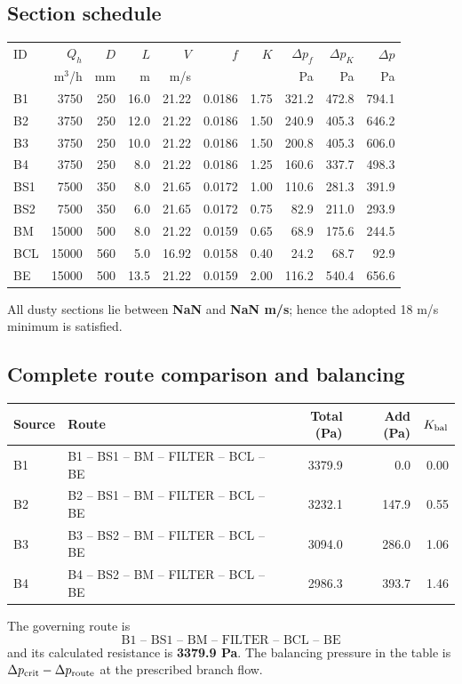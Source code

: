 \documentclass[11pt,a4paper]{article}
\begin{document}
\subsection{Section schedule}
\begin{center}\scriptsize
\begin{tabular}{lrrrrrrrrr}
\toprule
ID & $Q_h$ & $D$ & $L$ & $V$ & $f$ & $K$ & $\Delta p_f$ & $\Delta p_K$ & $\Delta p$\\
 & m$^3$/h & mm & m & m/s & & & Pa & Pa & Pa\\
\midrule
B1 & 3750 & 250 & 16.0 & 21.22 & 0.0186 & 1.75 & 321.2 & 472.8 & 794.1 \\
B2 & 3750 & 250 & 12.0 & 21.22 & 0.0186 & 1.50 & 240.9 & 405.3 & 646.2 \\
B3 & 3750 & 250 & 10.0 & 21.22 & 0.0186 & 1.50 & 200.8 & 405.3 & 606.0 \\
B4 & 3750 & 250 & 8.0 & 21.22 & 0.0186 & 1.25 & 160.6 & 337.7 & 498.3 \\
BS1 & 7500 & 350 & 8.0 & 21.65 & 0.0172 & 1.00 & 110.6 & 281.3 & 391.9 \\
BS2 & 7500 & 350 & 6.0 & 21.65 & 0.0172 & 0.75 & 82.9 & 211.0 & 293.9 \\
BM & 15000 & 500 & 8.0 & 21.22 & 0.0159 & 0.65 & 68.9 & 175.6 & 244.5 \\
BCL & 15000 & 560 & 5.0 & 16.92 & 0.0158 & 0.40 & 24.2 & 68.7 & 92.9 \\
BE & 15000 & 500 & 13.5 & 21.22 & 0.0159 & 2.00 & 116.2 & 540.4 & 656.6 \\
\bottomrule
\end{tabular}
\end{center}
All dusty sections lie between \textbf{NaN} and \textbf{NaN m/s}; hence the adopted 18 m/s minimum is satisfied.

\clearpage
\subsection{Complete route comparison and balancing}
\begin{center}\small
\begin{tabular}{llrrr}
\toprule
Source & Route & Total (Pa) & Add (Pa) & $K_{\rm bal}$\\
\midrule
B1 & B1 -- BS1 -- BM -- FILTER -- BCL -- BE & 3379.9 & 0.0 & 0.00 \\
B2 & B2 -- BS1 -- BM -- FILTER -- BCL -- BE & 3232.1 & 147.9 & 0.55 \\
B3 & B3 -- BS2 -- BM -- FILTER -- BCL -- BE & 3094.0 & 286.0 & 1.06 \\
B4 & B4 -- BS2 -- BM -- FILTER -- BCL -- BE & 2986.3 & 393.7 & 1.46 \\
\bottomrule
\end{tabular}
\end{center}
The governing route is
\[
\boxed{\text{B1 -- BS1 -- BM -- FILTER -- BCL -- BE}}
\]
and its calculated resistance is \textbf{3379.9 Pa}. The balancing pressure in the table is $\Delta p_{\rm crit}-\Delta p_{\rm route}$ at the prescribed branch flow.
\end{document}
